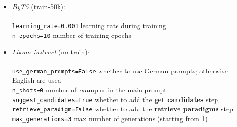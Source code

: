 \documentclass[11pt]{article}
\begin{document}
\begin{itemize}
    \item \textit{ByT5} (train-50k): \\ \\
    \texttt{learning\_rate=0.001} \quad learning rate during training \\
    \texttt{n\_epochs=10} \quad number of training epochs \\

    \item \textit{Llama-instruct} (no train): \\ \\
    \texttt{use\_german\_prompts=False} \quad whether to use German prompts; otherwise English are used \\
    \texttt{n\_shots=0} \quad number of examples in the main prompt \\
    \texttt{suggest\_candidates=True} \quad whether to add the \textbf{get candidates} step \\
    \texttt{retrieve\_paradigm=False} \quad whether to add the \textbf{retrieve paradigms} step \\
    \texttt{max\_generations=3} \quad max number of generations (starting from 1)

\end{itemize}
\end{document}
